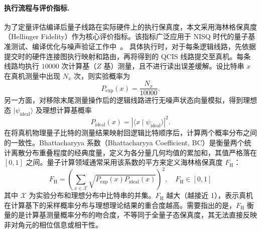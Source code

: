 \paragraph{执行流程与评价指标.}
为了定量评估编译后量子线路在实际硬件上的执行保真度，本文采用海林格保真度（Hellinger Fidelity）作为核心评价指标。该指标广泛应用于 NISQ 时代的量子基准测试、编译优化与噪声验证工作中~\cite{tomesh2022supermarq,gokhale2020openpulse,brandhofer2023qubitreuse}。
具体执行时，对于每条逻辑线路，先依据提交时的硬件连接图执行映射和路由，再将得到的 QCIS 线路提交至真机。每条线路均执行 $10000$ 次计算基（$Z$ 基）测量，且不进行读出误差缓解。设比特串 $x$ 在真机测量中出现 $N_x$ 次，则实验概率为
\begin{equation}
    P_{\mathrm{exp}}(x) = \frac{N_x}{10000}.
\end{equation}
另一方面，对移除末尾测量操作后的逻辑线路进行无噪声状态向量模拟，得到理想态 $\lvert\psi_{\mathrm{ideal}}\rangle$ 及理想计算基概率
\begin{equation}
    P_{\mathrm{ideal}}(x) = \left\lvert\langle x\mid\psi_{\mathrm{ideal}}\rangle\right\rvert^2.
\end{equation}
在将真机物理量子比特的测量结果映射回逻辑比特顺序后，计算两个概率分布之间的一致性。Bhattacharyya 系数（Bhattacharyya Coefficient, BC）是衡量两个统计离散分布重叠程度的经典度量，定义为各分量几何均值的累加和，其值严格落在 $[0, 1]$ 之间。量子计算领域通常采用该系数的平方来定义海林格保真度 $F_{\mathrm{H}}$：
\begin{equation}
    F_{\mathrm{H}} = \left(\sum_{x\in\mathcal{X}} \sqrt{P_{\mathrm{exp}}(x) P_{\mathrm{ideal}}(x)}\right)^2, \quad F_{\mathrm{H}} \in [0,1]
    \label{eq:hellinger-fidelity}
\end{equation}
其中 $\mathcal{X}$ 为实验分布和理想分布中比特串的并集。$F_{\mathrm{H}}$ 越大（越接近 1），表示真机在计算基下的采样概率分布与理想理论结果的重合度越高。需要指出的是，$F_{\mathrm{H}}$ 衡量的是计算基测量概率分布的吻合度，不等同于全量子态保真度，其无法直接反映非对角元的相位信息或相干性。
